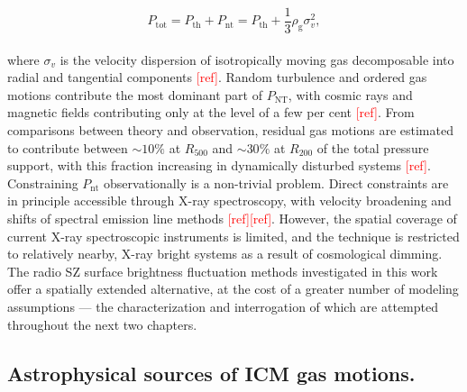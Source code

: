 \begin{equation}
	P_\mathrm{tot} = P_\mathrm{th} + P_{\mathrm{nt}} = P_\mathrm{th} + \frac{1}{3}\rho_{\mathrm{g}}\sigma_v^{2},
	\label{eq:Ptot}
\end{equation}
\\
where $\sigma_{v}$ is the velocity dispersion of isotropically moving gas decomposable into radial and tangential components \textcolor{red}{[ref]}. Random turbulence and ordered gas motions contribute the most dominant part of $P_\mathrm{NT}$, with cosmic rays and magnetic fields contributing only at the level of a few per cent \textcolor{red}{[ref]}. From comparisons between theory and observation, residual gas motions are estimated to contribute between $\sim 10\%$ at $R_{500}$ and $\sim 30\%$ at $R_{200}$ of the total pressure support, with this fraction increasing in dynamically disturbed systems 
\textcolor{red}{[ref]}.
\pbreak
Constraining $P_\mathrm{nt}$ observationally is a non-trivial 
problem. Direct constraints are in principle accessible through 
X-ray spectroscopy, with velocity broadening and shifts of spectral emission line methods \textcolor{red}{[ref]}\textcolor{red}{[ref]}. However, the spatial coverage of current X-ray spectroscopic instruments is limited, and the technique is restricted to relatively nearby, X-ray bright systems as a result of cosmological dimming. The radio SZ surface brightness fluctuation methods investigated in this work offer a spatially extended alternative, at the cost of a greater number of modeling assumptions — the characterization and interrogation of which are attempted throughout the next two chapters.

\subsection*{Astrophysical sources of ICM gas motions.}
\label{Chap:scientificLandscapeSourcesGasMotions}

